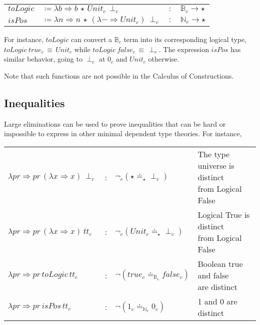 \begin{tabular}{llll}
  $toLogic$ & $\coloneqq\lambda b\Rightarrow b\,\star\,Unit_{c}\,\perp_{c}$ & $:$ & $\mathbb{B}_{c}\rightarrow\star$\tabularnewline
  $isPos$ & $\coloneqq\lambda n\Rightarrow n\,\star\,(\lambda-\Rightarrow Unit_{c})\,\perp_{c}$ & $:$ & $\mathbb{N}_{c}\rightarrow\star$\tabularnewline
\end{tabular}
  
For instance, $toLogic$ can convert a $\mathbb{B}_{c}$ term into its corresponding logical type, $toLogic\ true_{c}\,\equiv\, Unit_{c}$ while $toLogic\ false_{c}\, \equiv\, \perp_{c}$.
The expression $isPos$ has similar behavior, going to $\perp_{c}$ at $0_{c}$ and $Unit_{c}$ otherwise.

Note that such functions are not possible in the Calculus of Constructions.

\subsection{Inequalities}

Large eliminations can be used to prove inequalities that can be hard or impossible to express in other minimal dependent type theories. %
For instance, 

\begin{tabular}{lcll}
  $\lambda pr\Rightarrow pr\,\left(\lambda x\Rightarrow x\right)\,\perp_{c}$ & : & $\lnot_{c}(\star\doteq_{\star}\perp_{c})$ & \makecell{The type universe is distinct\\ from Logical False}\tabularnewline
  $\lambda pr\Rightarrow pr\,\left(\lambda x\Rightarrow x\right)\,tt_{c}$ & : & $\lnot_{c}(Unit_{c}\doteq_{\star}\perp_{c})$ &  \makecell{Logical True is distinct\\ from Logical False}\tabularnewline
  $\lambda pr\Rightarrow pr\,toLogic\,tt_{c}$ & : & $\lnot (true_{c}\doteq_{\mathbb{B}_{c}}false_{c})$ &  \makecell{Boolean true and false\\ are distinct}\tabularnewline
  $\lambda pr\Rightarrow pr\,isPos\,tt_{c}$ & : & $\lnot (1_{c}\doteq_{\mathbb{N}_{c}}0_{c})$ & 1 and 0 are distinct\tabularnewline
\end{tabular}
  


